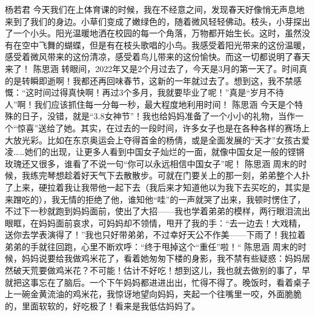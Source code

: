 {}\markdownRendererInterblockSeparator
{}杨若君\markdownRendererInterblockSeparator
{}今天我们在上体育课的时候，我在不经意之间，发现春天好像悄无声息地来到了我们的身边。小草们变成了嫩绿色的，随着微风轻轻佛动。枝头，小芽探出了一个小头。阳光温暖地洒在校园的每一个角落，万物都开始生长。这时，虽然没有在空中飞舞的蝴蝶，但是有在枝头歌唱的小鸟。我感受着阳光带来的这份温暖，感受着微风带来的这份清凉，感受着鸟儿带来的这份愉快。而这一切都说明了春天来了！\markdownRendererInterblockSeparator
{}\markdownRendererInterblockSeparator
{}陈思涵\markdownRendererInterblockSeparator
{}转眼间，2022年又是2个月过去了，今天是3月的第一天了。时间真的是转瞬即逝啊！我都还再回味春节，这新的一年就过去了。想到这，我不禁感慨：“这时间过得真快啊！再过3个多月，我就要毕业了呢！”真是“岁月不待人”啊！我们应该抓住每一分每一秒，最大程度地利用时间！\markdownRendererInterblockSeparator
{}\markdownRendererInterblockSeparator
{}陈思涵\markdownRendererInterblockSeparator
{}今天是个特殊的日子，没错，就是“3.8女神节”！我也给妈妈准备了一个小小的礼物，当作一个“惊喜”送给了她。其实，在过去的一段时间，许多女子也是在各种各样的赛场上大放光彩。比如在东京奥运会上夺得首金的杨倩，或是全面发展的“天才”女孩古爱凌……她们的出现，让更多人看到中国女子灿烂的一面，就像中国女足一般的铿锵玫瑰还又很多，谁看了不说一句“你可以永远相信中国女子”呢！\markdownRendererInterblockSeparator
{}\markdownRendererInterblockSeparator
{}陈思涵\markdownRendererInterblockSeparator
{}周末的时候，我练完琴想趁着好天气下去散散步。可就在门要关上的那一刻，弟弟整个人扑了上来，硬拉着我让我带他一起下去（我后来才知道他以为我下去买吃的，其实是来蹭吃的），我无情的拒绝了他，谁知他“哇”的一声就哭了出来，我顿时愣住了，不过下一秒就跑到妈妈面前，使出了大招——我也学着弟弟的模样，两行眼泪流出眼眶，在妈妈面前哀求，可妈妈却不领情，甩开了我的手：“去一边去！大戏精，送你去学表演得了！”我也只好带弟弟，不过幸好天公不作美——下雨了！我拉着弟弟的手就往回跑，心里不断欢呼：“终于甩掉这个“重任”啦！“\markdownRendererInterblockSeparator
{}\markdownRendererInterblockSeparator
{}陈思涵\markdownRendererInterblockSeparator
{}周末的时候，妈妈说要给我做鸡米花了，看着她匆匆下楼的身影，我不禁有些疑惑：妈妈居然破天荒要做鸡米花？不可能！估计不好吃！想到这儿，我也就去做别的事了，早就把这事忘在了脑后。一个下午妈妈都进进出出，忙得不得了。晚饭时，看着桌子上一碗金黄流油的鸡米花，我惊讶地望向妈妈，夹起一个往嘴里一咬，外面脆脆的，里面软软的，好吃极了！看来是我低估妈妈了。\markdownRendererInterblockSeparator
